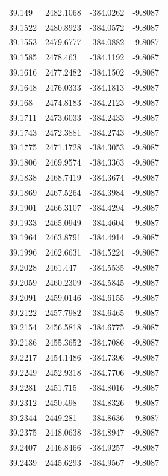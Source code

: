 \begin{table}[H]
\begin{tabular}{llll}
39.149 & 2482.1068 & -384.0262 & -9.8087 \\
39.1522 & 2480.8923 & -384.0572 & -9.8087 \\
39.1553 & 2479.6777 & -384.0882 & -9.8087 \\
39.1585 & 2478.463 & -384.1192 & -9.8087 \\
39.1616 & 2477.2482 & -384.1502 & -9.8087 \\
39.1648 & 2476.0333 & -384.1813 & -9.8087 \\
39.168 & 2474.8183 & -384.2123 & -9.8087 \\
39.1711 & 2473.6033 & -384.2433 & -9.8087 \\
39.1743 & 2472.3881 & -384.2743 & -9.8087 \\
39.1775 & 2471.1728 & -384.3053 & -9.8087 \\
39.1806 & 2469.9574 & -384.3363 & -9.8087 \\
39.1838 & 2468.7419 & -384.3674 & -9.8087 \\
39.1869 & 2467.5264 & -384.3984 & -9.8087 \\
39.1901 & 2466.3107 & -384.4294 & -9.8087 \\
39.1933 & 2465.0949 & -384.4604 & -9.8087 \\
39.1964 & 2463.8791 & -384.4914 & -9.8087 \\
39.1996 & 2462.6631 & -384.5224 & -9.8087 \\
39.2028 & 2461.447 & -384.5535 & -9.8087 \\
39.2059 & 2460.2309 & -384.5845 & -9.8087 \\
39.2091 & 2459.0146 & -384.6155 & -9.8087 \\
39.2122 & 2457.7982 & -384.6465 & -9.8087 \\
39.2154 & 2456.5818 & -384.6775 & -9.8087 \\
39.2186 & 2455.3652 & -384.7086 & -9.8087 \\
39.2217 & 2454.1486 & -384.7396 & -9.8087 \\
39.2249 & 2452.9318 & -384.7706 & -9.8087 \\
39.2281 & 2451.715 & -384.8016 & -9.8087 \\
39.2312 & 2450.498 & -384.8326 & -9.8087 \\
39.2344 & 2449.281 & -384.8636 & -9.8087 \\
39.2375 & 2448.0638 & -384.8947 & -9.8087 \\
39.2407 & 2446.8466 & -384.9257 & -9.8087 \\
39.2439 & 2445.6293 & -384.9567 & -9.8087 \\

\end{tabular}
\end{table}
